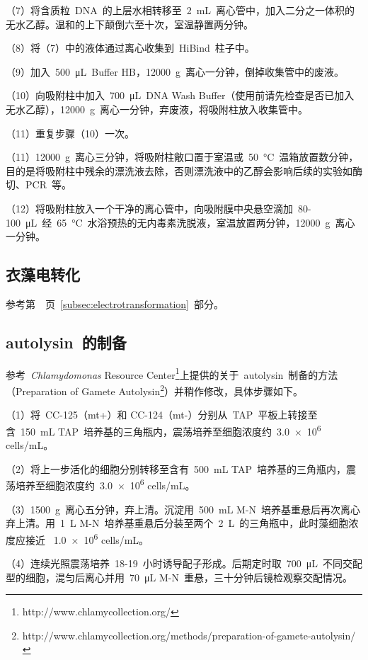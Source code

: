 （7）将含质粒\ DNA\ 的上层水相转移至\ \SI{2}{\mL}\ 离心管中，加入二分之一体积的无水乙醇。温和的上下颠倒六至十次，室温静置两分钟。

（8）将（7）中的液体通过离心收集到\ HiBind\ 柱子中。

（9）加入\ \SI{500}{\uL}\ Buffer HB，\SI{12000}{\g}\ 离心一分钟，倒掉收集管中的废液。

（10）向吸附柱中加入\ \SI{700}{\uL}\ DNA Wash Buffer（使用前请先检查是否已加入无水乙醇），\SI{12000}{\g}\ 离心一分钟，弃废液，将吸附柱放入收集管中。

（11）重复步骤（10）一次。

 （11）\SI{12000}{\g}\ 离心三分钟，将吸附柱敞口置于室温或\ \SI{50}{\degreeCelsius}\ 温箱放置数分钟，目的是将吸附柱中残余的漂洗液去除，否则漂洗液中的乙醇会影响后续的实验如酶切、PCR\ 等。

 （12）将吸附柱放入一个干净的离心管中，向吸附膜中央悬空滴加\ 80-\SI{100}{\uL}\ 经\ \SI{65}{\degreeCelsius}\ 水浴预热的无内毒素洗脱液，室温放置两分钟，\SI{12000}{\g}\ 离心一分钟。

\subsection{衣藻电转化}
参考第\ \pageref{subsec:electrotransformation}\ 页\ \ref{subsec:electrotransformation}\ 部分。

\subsection{autolysin\ 的制备}\label{subsec:autolysin}
参考\ \textit{Chlamydomonas} Resource Center\footnote{http://www.chlamycollection.org/}上提供的关于\ autolysin\ 制备的方法（Preparation of Gamete Autolysin\footnote{http://www.chlamycollection.org/methods/preparation-of-gamete-autolysin/}）并稍作修改，具体步骤如下。

（1）将\ CC-125（mt+）和{} CC-124（mt-）分别从\ TAP\ 平板上转接至含\ \SI{150}{\mL}{} TAP\ 培养基的三角瓶内，震荡培养至细胞浓度约\ \num{3.0e6}{} cells/\si{\mL}。

（2）将上一步活化的细胞分别转移至含有\ \SI{500}{\mL}{} TAP\ 培养基的三角瓶内，震荡培养至细胞浓度约\ \num{3.0e6}{} cells/\si{\mL}。

（3）\SI{1500}{\g}\ 离心五分钟，弃上清。沉淀用\ \SI{500}{\mL}{} M-N\ 培养基重悬后再次离心弃上清。用\ \SI{1}{\L}{} M-N\ 培养基重悬后分装至两个\ \SI{2}{\L}\ 的三角瓶中，此时藻细胞浓度应接近
\ \num{1.0e6}{} cells/\si{\mL}。

（4）连续光照震荡培养\ 18-19\ 小时诱导配子形成。后期定时取\ \SI{700}{\uL}\ 不同交配型的细胞，混匀后离心并用\ \SI{70}{\uL}{} M-N\ 重悬，三十分钟后镜检观察交配情况。

